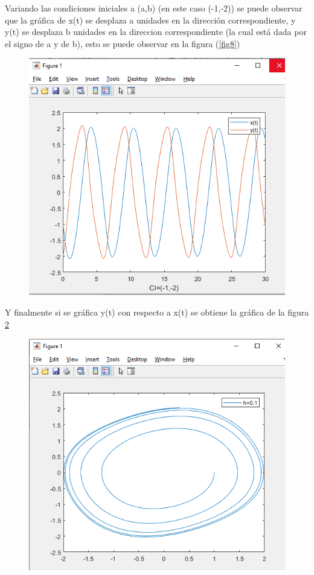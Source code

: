 \documentclass[12pt]{article}
\begin{document}
Variando las condiciones iniciales a (a,b) (en este caso (-1,-2)) se puede observar que la gráfica de x(t) se desplaza a unidades en la dirección correspondiente, y y(t) se desplaza b unidades en la direccion correspondiente (la cual está dada por el signo de a y de b), esto se puede observar en la figura (\ref{fig8})
\begin{figure}[h]
	\centering
	\caption{}
	\includegraphics[scale=0.45]{graf8.png}
	\label{graf8}
\end{figure}
\newpage
Y finalmente si se gráfica y(t) con respecto a x(t) se obtiene la gráfica de la figura \ref{graf9}
\begin{figure}[h]
\centering
\caption{}
\includegraphics[scale=0.45]{graf9.png}
\label{graf9}
\end{figure}
\end{document}
